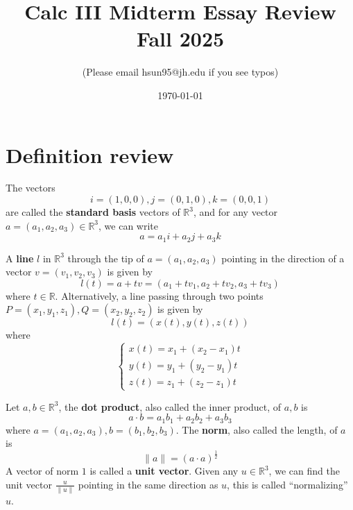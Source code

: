\documentclass[openany]{book}
\title{Calc III Midterm Essay Review
\\ 
\vspace{0.4cm}
\large Fall 2025}
\author{(Please email hsun95@jh.edu if you see typos)}
\date{\today}
\newcommand{\R}{\mathbb{R}}
\begin{document}
\maketitle

\tableofcontents
\newpage


\chapter{Definition review}



\begin{defn}[standard basis in $\R^3$]
    The vectors 
    \begin{equation*}
        i=(1,0,0), j=(0,1,0), k=(0,0,1)
    \end{equation*}
    are called the \textbf{standard basis} vectors of $\R^3$, and for any vector $a=(a_1,a_2,a_3)\in\R^3$, we can write 
    \begin{equation*}
        a=a_1i+a_2j+a_3k
    \end{equation*}
\end{defn}



\begin{defn}\label{line}
    A \textbf{line} $l$ in $\R^3$ through the tip of $a=(a_1,a_2,a_3)$ pointing in the direction of a vector $v=(v_1,v_2,v_3)$ is given by 
    \begin{equation*}
        l(t)=a+tv=(a_1+tv_1, a_2+tv_2, a_3+tv_3)
    \end{equation*}
    where $t\in\R$. Alternatively, a line passing through two points $P=(x_1,y_1,z_1), Q=(x_2,y_2,z_2)$ is given by 
    \begin{equation*}
        l(t)=(x(t), y(t), z(t))
    \end{equation*}
    where 
    \begin{equation*}
        \begin{cases}
            x(t)=x_1+(x_2-x_1)t\\
            y(t)=y_1+(y_2-y_1)t\\
            z(t)=z_1+(z_2-z_1)t
        \end{cases}
    \end{equation*}
\end{defn}



\begin{defn}
    Let $a,b\in\R^3$, the \textbf{dot product}, also called the inner product, of $a,b$ is 
    \begin{equation*}
        a\cdot b=a_1b_1+a_2b_2+a_3b_3
    \end{equation*}
    where $a=(a_1,a_2,a_3), b=(b_1,b_2,b_3)$. The \textbf{norm}, also called the length, of $a$ is 
    \begin{equation*}
        \|a\|=(a\cdot a)^\frac{1}{2}
    \end{equation*}
    A vector of norm $1$ is called a \textbf{unit vector}. Given any $u\in\R^3$, we can find the unit vector $\frac{u}{\|u\|}$ pointing in the same direction as $u$, this is called ``normalizing'' $u$.
\end{defn}
\end{document}
